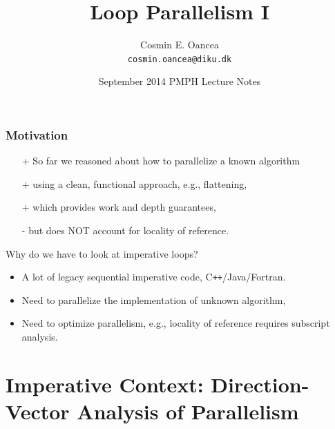 \documentclass{beamer}
\title[Loop Parallelism]{Loop Parallelism I}
\author[C.~Oancea]{Cosmin E. Oancea\\{\tt cosmin.oancea@diku.dk}}
\institute{Department of Computer Science (DIKU)\\University of Copenhagen}
\date[Sept 2014]{September 2014 PMPH Lecture Notes}
\newcommand{\emp}[1]{\textcolor{DikuRed}{ #1}}
\begin{document}
\titleslide




\begin{frame}
  \frametitle{Motivation}

\begin{itemize}
    \item[+] So far we reasoned about how to parallelize a known algorithm
    \item[+] using a clean, functional approach, e.g., flattening, 
    \item[+] which provides work and depth guarantees,
    \item[\alert{-}] but does \alert{NOT} account for locality of reference.

\end  {itemize}\bigskip

\emp{Why do we have to look at imperative loops?}
\begin{itemize}    
    \item A lot of legacy sequential imperative code, C{\tt++}/Java/Fortran.\medskip
    \item Need to parallelize the implementation of unknown algorithm,\medskip
    \item Need to optimize parallelism, e.g., locality of reference requires subscript analysis. 
\end  {itemize}  

\end{frame}


\section{Imperative Context: Direction-Vector Analysis of Parallelism}

\begin{frame}[fragile]
	\tableofcontents[currentsection]
\end{frame}
\end{document}
